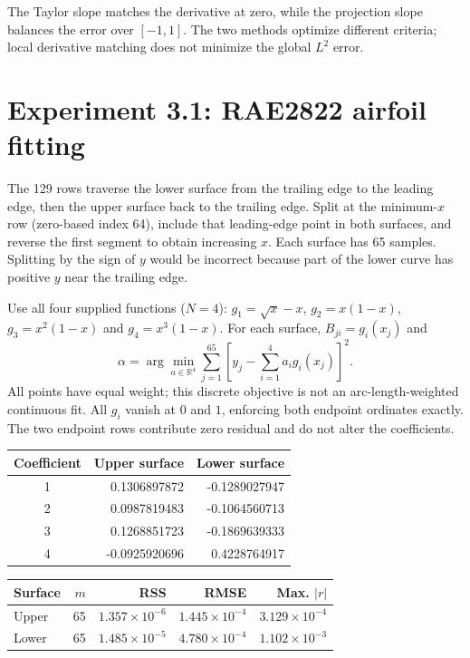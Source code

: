 \documentclass[11pt,a4paper]{article}
\newcommand{\R}{\mathbb{R}}
\begin{document}
The Taylor slope matches the derivative at zero, while the projection slope balances the error over $[-1,1]$. The two methods optimize different criteria; local derivative matching does not minimize the global $L^2$ error.

\clearpage
\section{Experiment 3.1: RAE2822 airfoil fitting}
The 129 rows traverse the lower surface from the trailing edge to the leading edge, then the upper surface back to the trailing edge. Split at the minimum-$x$ row (zero-based index 64), include that leading-edge point in both surfaces, and reverse the first segment to obtain increasing $x$. Each surface has 65 samples. Splitting by the sign of $y$ would be incorrect because part of the lower curve has positive $y$ near the trailing edge.

Use all four supplied functions ($N=4$): $g_1=\sqrt{x}-x$, $g_2=x(1-x)$, $g_3=x^2(1-x)$ and $g_4=x^3(1-x)$. For each surface, $B_{ji}=g_i(x_j)$ and
\[
\alpha=\arg\min_{a\in\R^4}\sum_{j=1}^{65}\left[y_j-\sum_{i=1}^4a_i g_i(x_j)\right]^2.
\]
All points have equal weight; this discrete objective is not an arc-length-weighted continuous fit. All $g_i$ vanish at $0$ and $1$, enforcing both endpoint ordinates exactly. The two endpoint rows contribute zero residual and do not alter the coefficients.
\begin{center}\footnotesize
\begin{minipage}[t]{.45\textwidth}\centering
\begin{tabular}{crr}\toprule
Coefficient & Upper surface & Lower surface\\\midrule
1 & 0.1306897872 & -0.1289027947 \\
2 & 0.0987819483 & -0.1064560713 \\
3 & 0.1268851723 & -0.1869639333 \\
4 & -0.0925920696 & 0.4228764917 \\
\bottomrule\end{tabular}\end{minipage}\hfill
\begin{minipage}[t]{.53\textwidth}\centering
\begin{tabular}{lrrrr}\toprule
Surface & $m$ & RSS & RMSE & Max. $|r|$\\\midrule
Upper & 65 & $1.357\times10^{-6}$ & $1.445\times10^{-4}$ & $3.129\times10^{-4}$ \\
Lower & 65 & $1.485\times10^{-5}$ & $4.780\times10^{-4}$ & $1.102\times10^{-3}$ \\
\bottomrule\end{tabular}\end{minipage}
\end{center}
\end{document}
